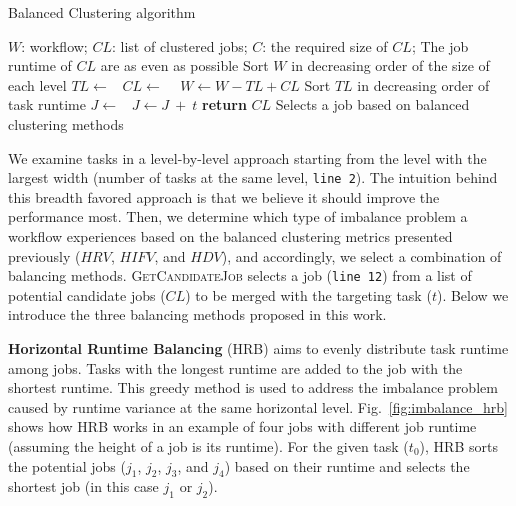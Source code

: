 \begin{algorithm}[htb]
	\caption{ Balanced Clustering algorithm}
	\footnotesize
	\label{alg:imbalance_algo}
	\begin{algorithmic}[1]
		\Require $W$: workflow; $CL$: list of clustered jobs; $C$: the required size of $CL$; 
		\Ensure The job runtime of $CL$ are as even as possible
			\State Sort $W$ in decreasing order of the size of each level
				\State $TL\gets $\  
				\State $CL\gets$  \  
				\State $W \gets W - TL + CL$   
			\EndFor
		\EndProcedure
			\State Sort $TL$ in decreasing order of task runtime
				\State $J \gets $\  
				\State  $J \gets J\ +\ t$ 
			\EndFor
			\State \textbf{return} $CL$
		\EndProcedure
			\State Selects a job based on balanced clustering methods
		\EndProcedure
	\end{algorithmic}
\end{algorithm}

We examine tasks in a level-by-level approach starting from the level with the largest width (number of tasks at the same level, \texttt{line 2}). The intuition behind this breadth favored approach is that we believe it should improve the performance most. Then, we determine which type of imbalance problem a workflow experiences based on the balanced clustering metrics presented previously ($HRV$, $HIFV$, and $HDV$), and accordingly, we select a combination of balancing methods. \textsc{GetCandidateJob} selects a job (\texttt{line 12}) from a list of potential candidate jobs ($CL$) to be merged with the targeting task ($t$). Below we introduce the three balancing methods proposed in this work.

\textbf{Horizontal Runtime Balancing} (HRB) aims to evenly distribute task runtime among jobs. Tasks with the longest runtime are added to the job with the shortest runtime. This greedy method is used to address the imbalance problem caused by runtime variance at the same horizontal level. Fig.~\ref{fig:imbalance_hrb} shows how HRB works in an example of four jobs with different job runtime (assuming the height of a job is its runtime). For the given task ($t_0$), HRB sorts the potential jobs ($j_1$, $j_2$, $j_3$, and $j_4$) based on their runtime and selects the shortest job (in this case $j_1$ or $j_2$). 

